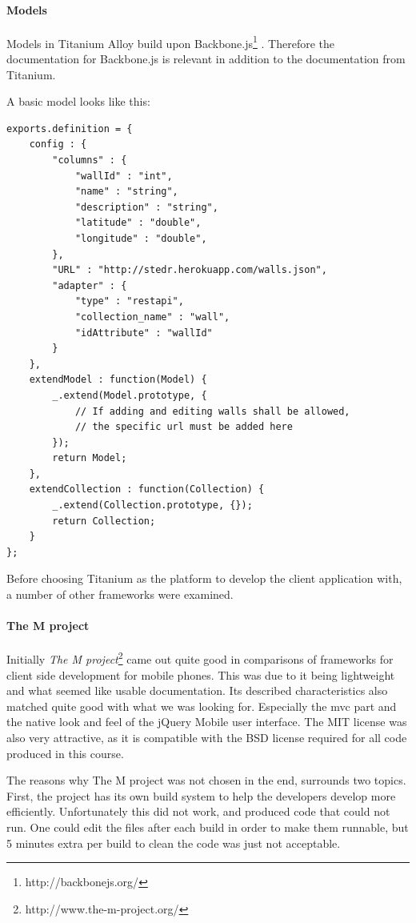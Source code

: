 \documentclass[11pt]{book}
\begin{document}
\paragraph{Models}
Models in Titanium Alloy build upon Backbone.js\footnote{http://backbonejs.org/} \cite{titaniumAlloyModel}. Therefore the documentation for Backbone.js is relevant in addition to the documentation from Titanium.

A basic model looks like this:
\begin{lstlisting}[frame=single]
exports.definition = {
    config : {
        "columns" : {
            "wallId" : "int",
            "name" : "string",
            "description" : "string",
            "latitude" : "double",
            "longitude" : "double",
        },
        "URL" : "http://stedr.herokuapp.com/walls.json",
        "adapter" : {
            "type" : "restapi",
            "collection_name" : "wall",
            "idAttribute" : "wallId"
        }
    },
    extendModel : function(Model) {
        _.extend(Model.prototype, {
            // If adding and editing walls shall be allowed,
            // the specific url must be added here
        });
        return Model;
    },
    extendCollection : function(Collection) {
        _.extend(Collection.prototype, {});
        return Collection;
    }
};
\end{lstlisting}

Before choosing Titanium as the platform to develop the client application with, a number of other frameworks were examined.

\paragraph{The M project}
Initially \emph{The M project}\footnote{http://www.the-m-project.org/} came out quite good in comparisons of frameworks for client side development for mobile phones. This was due to it being lightweight and what seemed like usable documentation. Its described characteristics also matched quite good with what we was looking for. Especially the \gls{mvc} part and the native look and feel of the jQuery Mobile user interface. The MIT license was also very attractive, as it is compatible with the BSD license required for all code produced in this course.

The reasons why The M project was not chosen in the end, surrounds two topics. First, the project has its own build system to help the developers develop more efficiently. Unfortunately this did not work, and produced code that could not run. One could edit the files after each build in order to make them runnable, but 5 minutes extra per build to clean the code was just not acceptable.
\end{document}
